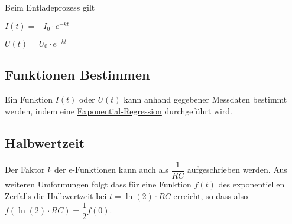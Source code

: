 \documentclass{article}
\begin{document}
\vspace*{2\baselineskip} 
\noindent Beim Entladeprozess gilt \newline 
\begin{minipage}{0.5\linewidth}
 \center
 $I(t)=-I_0 \cdot e^{-kt}$
 
\end{minipage}
\hfill
\begin{minipage}{0.5\linewidth}
 \center
 $U(t)=U_0 \cdot e^{-kt}$
 
\end{minipage}  
 
\subsection{Funktionen Bestimmen}
Ein Funktion $I(t)$ oder $U(t)$ kann anhand gegebener Messdaten bestimmt werden, indem eine \hyperref[Umgang mit dem Taschenrechner in Physik]{Exponential-Regression} durchgeführt wird.
 
\subsection{Halbwertzeit}
Der Faktor $k$ der e-Funktionen kann auch als $\dfrac{1}{RC}$ aufgeschrieben werden. Aus weiteren Umformungen folgt dass für eine Funktion $f(t)$ des exponentiellen Zerfalls die Halbwertzeit bei $t = \ln{(2)} \cdot RC$ erreicht, so dass also $f(\ln{(2)} \cdot RC) = \dfrac{1}{2} f(0)$. 
\end{document}
